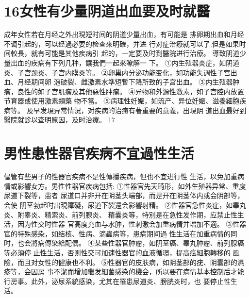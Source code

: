 \documentclass[12pt,UTF8]{ctexbook}
\begin{document}
\section{16女性有少量阴道出血要及时就醫}
成年女性若在月经之外出現短时间的阴道少量出血，有可能是
排卵期出血和月经不调引起的，可以经過必要的检查來明確，并进
行对症治療就可以了;但是如果时间較長，就有可能是其他疾病引
起的，一定要及时到醫院进行治療。
導致阴道少量出血的疾病有下列几种，讓我們一起來瞭解一
下。
①内生殖器炎症，如阴道炎、子宫颈炎、子宫内膜炎等。
②卵巢内分泌功能变化，如功能失调性子宫出血、月经期间卵
泡破裂、雌激素水準短暫下降所致的子宫出血。
③内生殖器肿瘤，良性的如子宫肌瘤及其他惡性肿瘤。
④异物和外源性激素，如子宫腔内放置节育器或使用激素類藥
物不當。
⑤病理性妊娠，如流产、异位妊娠、滋養細胞疾病等。
及早发現异常情況，对疾病的治癒有著重要的意義，出現阴
道出血最好到醫院就診以查明原因，及时治療。
17
\section{男性患性器官疾病不宜過性生活}
儘管有些男子的性器官疾病不是性傳播疾病，但也不宜进行性
生活，以免加重病情或影響女方。男性性器官疾病包括:
①性器官先天畸形，如外生殖器异常、重度尿道下裂等，患者
尿道口并非开在阴茎头端部，而是开在阴茎体内或会阴部等，会使
阴茎勃起时出現障礙，尿道下裂還会影響射精。
②性器官急性炎症，如睾丸炎、附睾炎、精索炎、前列腺炎、
精囊炎等，特別是在急性发作期，应禁止性生活，因为性交时性器
官高度充血与水肿，性刺激会加重病情并增加不適。
③性器官的特殊感染，如结核、性病、滴蟲病等，患病期间過
性生活在加重病情的同时，也会將病傳染給配偶。
④某些性器官肿瘤，如阴茎癌、睾丸肿瘤、前列腺癌等必須停
止性生活，否则性交可加速性器官的血液循環，提高癌細胞轉移的
風險，而且对女性的健康也不利。
⑤性器官的皮肤病，如阴茎部的疣、阴囊部的濕疹等，会因房
事不潔而增加繼发細菌感染的機会，所以要在病情基本控制后才能
行房事。此外，泌尿系統感染，尤其在罹患尿道炎、膀胱炎时，也
要停止性生活。
\end{document}
